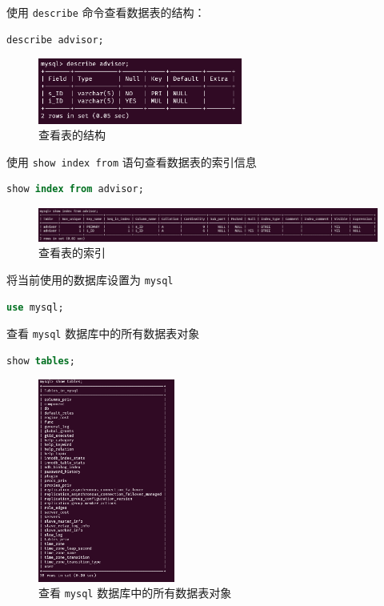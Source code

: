 \documentclass{article}
\begin{document}
使用 \texttt{describe} 命令查看数据表的结构：

\begin{lstlisting}[language=sql]
describe advisor;
\end{lstlisting}

\begin{figure}[H]
  \centering
  \includegraphics[width=0.6\textwidth]{img/13.png}
  \caption{查看表的结构}
\end{figure}

使用 \texttt{show index from} 语句查看数据表的索引信息

\begin{lstlisting}[language=sql]
show index from advisor;
\end{lstlisting}

\begin{figure}[H]
  \centering
  \includegraphics[width=\textwidth]{img/14.png}
  \caption{查看表的索引}
\end{figure}

将当前使用的数据库设置为 \texttt{mysql}

\begin{lstlisting}[language=sql]
use mysql;
\end{lstlisting}

查看 \texttt{mysql} 数据库中的所有数据表对象

\begin{lstlisting}[language=sql]
show tables;
\end{lstlisting}

\begin{figure}[H]
  \centering
  \includegraphics[width=0.4\textwidth]{img/15.png}
  \caption{查看 \texttt{mysql} 数据库中的所有数据表对象}
\end{figure}
\end{document}
